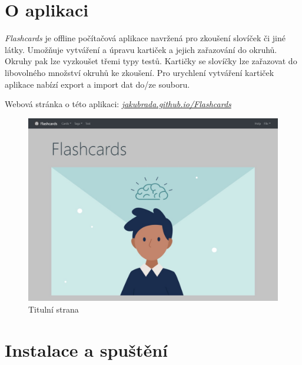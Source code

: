\documentclass[11pt]{article}
\begin{document}

\clearpage
\tableofcontents
\clearpage
\hypertarget{o-aplikaci}{%
\section{O aplikaci}\label{o-aplikaci}}

\emph{Flashcards} je offline počítačová aplikace navržená pro zkoušení
slovíček či jiné látky. Umožňuje vytváření a úpravu kartiček a jejich
zařazování do okruhů. Okruhy pak lze vyzkoušet třemi typy testů.
Kartičky se slovíčky lze zařazovat do libovolného množství okruhů ke
zkoušení. Pro urychlení vytváření kartiček aplikace nabízí export a
import dat do/ze souboru.

Webová stránka o této aplikaci:
\href{https://jakubrada.github.io/Flashcards/}{\emph{jakubrada.github.io/Flashcards}}

\begin{figure}
\centering
\includegraphics{assets/title_page.jpg}
\caption{Titulní strana}
\end{figure}

\hypertarget{instalace-a-spuux161tux11bnuxed}{%
\section{Instalace a spuštění}\label{instalace-a-spuux161tux11bnuxed}}
\end{document}
